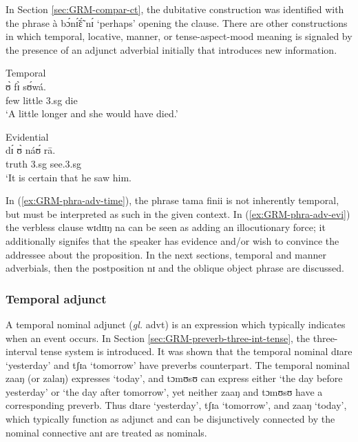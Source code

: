\begin{exe}
\begin{exe}
\begin{exe}
 In Section \ref{sec:GRM-compar-ct}, the dubitative construction was 
identified with the phrase  {\sls à bɔ́nɪ̃́ɛ̃́ nɪ́}  `perhaps'  opening the 
clause. There are other constructions in which temporal, locative, manner, or 
tense-aspect-mood meaning is signaled by the presence of an adjunct adverbial  
initially that introduces new information.  

\ea\label{ex:GRM-phra-adv}

\ea\label{ex:GRM-phra-adv-time}{\rm Temporal}\\
\gll [tàmá fìníì] ʊ̀ fɪ̀ sʊ́wá.\\
few little {\sc 3.sg} {\mod} die\\
\glt `A little longer and she would  have died.'


\ex\label{ex:GRM-phra-adv-evi}{\rm Evidential}\\
\gll [wɪ́dɪ́ɪ́ŋ ná] dɪ́ ʊ̀ náʊ́ rā.\\
truth {\foc} {\comp} {\sc 3.sg} see.{\sc 3.sg} {\foc}\\
\glt  `It is certain that he saw him.

\z 
 \z



In (\ref{ex:GRM-phra-adv-time}), the phrase {\sls tama finii} is not inherently 
temporal, but must be interpreted as such in the given context. In 
(\ref{ex:GRM-phra-adv-evi}) the verbless clause {\sls wɪdɪɪŋ na}  can be seen as 
adding an illocutionary force; it additionally signifes that the speaker has 
evidence and/or wish to convince the addressee about the proposition. In the  
next sections,  temporal and manner adverbials, then the postposition {\sls nɪ} 
and the oblique object phrase are discussed.


% 

\subsubsection{Temporal  adjunct}
\label{sec:GRM-manner-adv}

A temporal nominal adjunct  ({\it gl.} {\sc advt}) is an expression which 
typically indicates when  an event occurs. In Section 
\ref{sec:GRM-preverb-three-int-tense}, the three-interval tense system is 
introduced.  It was shown that the temporal nominal {\sls  dɪare} `yesterday' 
and 
{\sls tʃɪa} `tomorrow'  have preverbs counterpart.  The  temporal nominal  
{\sls 
zaaŋ} (or {\sls zalaŋ}) expresses `today',  and   {\sls tɔmʊsʊ} can express 
either 
 `the day before yesterday' or  `the day after tomorrow',   yet neither {\sls 
zaaŋ} and {\sls tɔmʊsʊ}   have a corresponding preverb. Thus {\sls  dɪare} 
`yesterday',  {\sls tʃɪa} `tomorrow',   and  {\sls zaaŋ} `today', which  
typically 
function as adjunct  and can be disjunctively connected by the nominal 
connective {\sls anɪ}  are  treated as nominals.


\end{exe}
\end{exe}
\end{exe}
